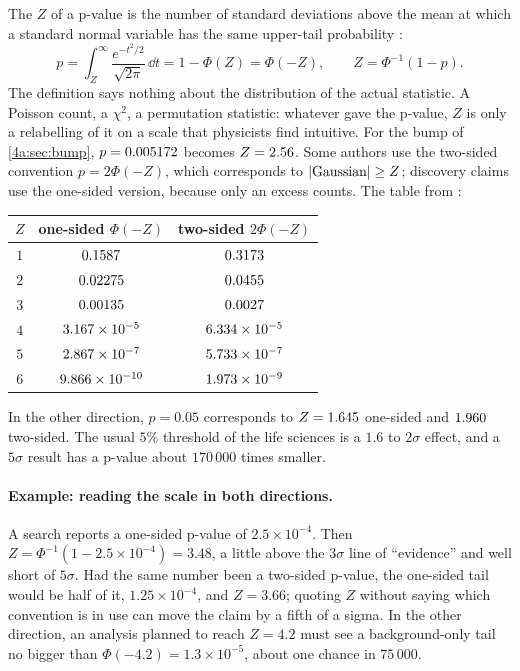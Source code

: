 The  $Z$ of a p-value is the number of standard
deviations above the mean at which a standard normal variable has the same
upper-tail probability \cite{Cowan2011}:
\begin{equation}
  p=\int_Z^\infty\frac{e^{-t^2/2}}{\sqrt{2\pi}}\,\dd t=1-\Phi(Z)=\Phi(-Z),
  \qquad
  Z=\Phi^{-1}(1-p) .
  \label{4a:eq:p-to-z}
\end{equation}
The definition says nothing about the distribution of the actual statistic. A
Poisson count, a $\chi^2$, a permutation statistic: whatever gave the p-value,
$Z$ is only a relabelling of it on a scale that physicists find intuitive. For
the bump of \cref{4a:sec:bump}, $p=0.005172$ becomes $Z=2.56$. Some
authors use the two-sided convention $p=2\Phi(-Z)$, which corresponds to
$\left\lvert \text{Gaussian}\right\rvert\ge Z$; discovery claims use the one-sided version,
because only an excess counts. The table from
:
\begin{center}
\begin{tabular}{ccc}
\toprule
$Z$ & one-sided $\Phi(-Z)$ & two-sided $2\Phi(-Z)$ \\
\midrule
$1$ & $0.1587$ & $0.3173$ \\
$2$ & $0.02275$ & $0.0455$ \\
$3$ & $0.00135$ & $0.0027$ \\
$4$ & $3.167\times10^{-5}$ & $6.334\times10^{-5}$ \\
$5$ & $2.867\times10^{-7}$ & $5.733\times10^{-7}$ \\
$6$ & $9.866\times10^{-10}$ & $1.973\times10^{-9}$ \\
\bottomrule
\end{tabular}
\end{center}
In the other direction, $p=0.05$ corresponds to $Z=1.645$
one-sided and $1.960$ two-sided. The usual $5\%$ threshold of
the life sciences is a $1.6$ to $2\sigma$ effect, and a $5\sigma$ result has a
p-value about $170\,000$ times smaller.

\paragraph{Example: reading the scale in both directions.}
A search reports a one-sided p-value of $2.5\times10^{-4}$. Then
$Z=\Phi^{-1}(1-2.5\times10^{-4})=3.48$, a little above the $3\sigma$ line of
``evidence'' and well short of $5\sigma$. Had the same number been a
two-sided p-value, the one-sided tail would be half of it, $1.25\times10^{-4}$,
and $Z=3.66$; quoting $Z$ without saying which convention is in use can move
the claim by a fifth of a sigma. In the other direction, an analysis planned
to reach $Z=4.2$ must see a background-only tail no bigger than
$\Phi(-4.2)=1.3\times10^{-5}$, about one chance in $75\,000$.

